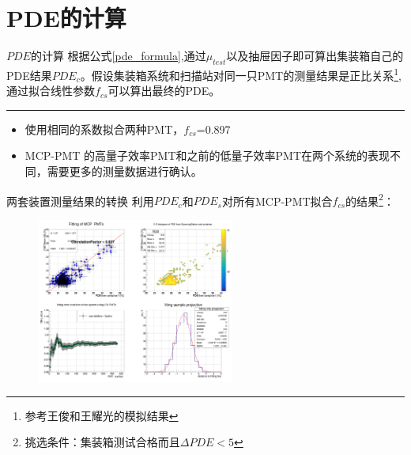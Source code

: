 \documentclass[11pt,compress,xcolor=x11names,UTF8]{beamer}
\begin{document}
\section{PDE的计算}
\begin{frame}{$PDE$的计算}
根据公式\ref{pde_formula},通过$\mu_{test}$以及抽屉因子即可算出集装箱自己的PDE结果$PDE_c$。假设集装箱系统和扫描站对同一只PMT的测量结果是正比关系\footnote{参考王俊和王耀光的模拟结果},通过拟合线性参数$f_{cs}$可以算出最终的PDE。
\vspace{.5cm}
\hrule{\textwidth}
\vspace{.5cm}

\begin{itemize}
\item 使用相同的系数拟合两种PMT，$f_{cs}$=0.897
\item MCP-PMT 的高量子效率PMT和之前的低量子效率PMT在两个系统的表现不同，需要更多的测量数据进行确认。
\end{itemize}
\end{frame}
\begin{frame}{两套装置测量结果的转换}
利用$PDE_c$和$PDE_s$对所有MCP-PMT拟合$f_{cs}$的结果\footnote{挑选条件：集装箱测试合格而且$\Delta PDE<5$}：
\begin{figure}
\centering
\includegraphics[width=0.58\textwidth]{fit_mcp_noint}
\end{figure}

\end{frame}
\end{document}
